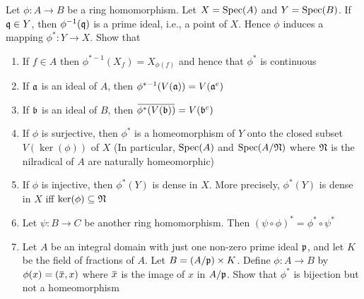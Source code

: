 \documentclass[11pt]{article}
\begin{document}
\begin{exercise}
\label{ex1.21}
Let \(\phi:A\to B\) be a ring homomorphism. Let \(X=\operatorname{Spec}(A)\) and \(Y=\operatorname{Spec}(B)\). If \(\mathfrak{q}\in Y\),
then \(\phi^{-1}(\mathfrak{q})\) is a prime ideal, i.e., a point of \(X\). Hence \(\phi\) induces a
mapping \(\phi^*:Y\to X\). Show that
\begin{enumerate}
\item If \(f\in A\) then \(\phi^{*-1}(X_f)=X_{\phi(f)}\) and hence that \(\phi^*\) is continuous
\item If \(\mathfrak{a}\) is an ideal of \(A\), then \(\phi^{*-1}(V(\mathfrak{a}))=V(\mathfrak{a}^e)\)
\item If \(\mathfrak{b}\) is an ideal of \(B\), then \(\bbar{\phi^*(V(\fb))}=V(\fb^c)\)
\item If \(\phi\) is surjective, then \(\phi^*\) is a homeomorphism of \(Y\) onto the closed
subset \(V(\ker(\phi))\) of \(X\) (In particular, \(\operatorname{Spec}(A)\) and \(\operatorname{Spec}(A/\mathfrak{N})\) where \(\mathfrak{N}\) is
the nilradical of \(A\) are naturally homeomorphic)
\item If \(\phi\) is injective, then \(\phi^*(Y)\) is dense in \(X\). More precisely, \(\phi^*(Y)\) is dense
in \(X\) iff \(\ker(\phi)\subseteq\mathfrak{N}\)
\item Let \(\psi:B\to C\) be another ring homomorphism. Then \((\psi\circ\phi)^*=\phi^*\circ\psi^*\)
\item Let \(A\) be an integral domain with just one non-zero prime ideal \(\mathfrak{p}\), and let \(K\) be
the field of fractions of \(A\). Let \(B=(A/\mathfrak{p})\times K\). Define \(\phi:A\to B\) by \(\phi(x)=(\barx,x)\)
where \(\barx\) is the image of \(x\) in \(A/\mathfrak{p}\). Show that \(\phi^*\) is bijection but not a homeomorphism
\end{enumerate}
\end{exercise}
\end{document}
